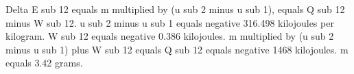 Delta E sub 12 equals m multiplied by (u sub 2 minus u sub 1), equals Q sub 12 minus W sub 12.  
u sub 2 minus u sub 1 equals negative 316.498 kilojoules per kilogram.  
W sub 12 equals negative 0.386 kilojoules.  
m multiplied by (u sub 2 minus u sub 1) plus W sub 12 equals Q sub 12 equals negative 1468 kilojoules.  
m equals 3.42 grams.